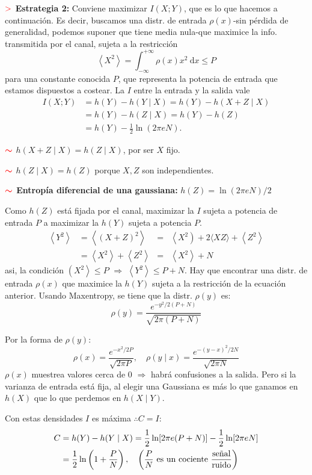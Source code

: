 \documentclass[%
 reprint,
 amsmath,amssymb,
 aps,
]{revtex4-1}
\begin{document}
\textbf{$\textcolor{red}{\mathbf{>}}$ Estrategia 2:}
Conviene maximizar $I(X ; Y)$, que es lo que hacemos a continuación. Es decir, buscamos una distr. de entrada $\rho(x)$-sin pérdida de generalidad, podemos suponer que tiene media nula-que
maximice la info. transmitida por el canal, sujeta a la restricción
$$
\left\langle X^{2}\right\rangle=\int_{-\infty}^{+\infty} \rho(x) x^{2} \mathrm{~d} x \leq P
$$
para una constante conocida $P$, que representa la potencia de entrada que estamos dispuestos a costear.
La $I$ entre la entrada y la salida vale
$$
\begin{aligned}
I(X ; Y) &=h(Y)-h(Y \mid X) =h(Y)-h(X+Z \mid X) \\
&=h(Y)-h(Z \mid X) =h(Y)-h(Z) \\
&=h(Y)-\frac{1}{2} \ln (2 \pi e N) .
\end{aligned}
$$

\textbf{$\textcolor{red}{\color{red}{\boldsymbol{\sim}}}$}
$h(X+Z \mid X)=h(Z \mid X)$, por ser $X$ fijo.

\textbf{$\textcolor{red}{\color{red}{\boldsymbol{\sim}}}$}
$h(Z \mid X)=h(Z)$ porque $X,Z$ son independientes.

\textbf{$\textcolor{red}{\color{red}{\boldsymbol{\sim}}}$ Entropía diferencial de una gaussiana:} 
$h(Z)=\ln (2 \pi e N) / 2$

Como $h(Z)$ está fijada por el canal, maximizar la $I$ sujeta a potencia de entrada $P$ a maximizar la $h(Y)$ sujeta a potencia $P$. $$
\begin{aligned}
\left\langle Y^{2}\right\rangle &=\left\langle(X+Z)^{2}\right\rangle &=&\left\langle X^{2}\right)+2\langle X Z\rangle+\left\langle Z^{2}\right\rangle \\
&=\left\langle X^{2}\right\rangle+\left\langle Z^{2}\right\rangle&=&\left\langle X^{2}\right\rangle+N
\end{aligned}
$$
asi, la condición $\left(X^{2}\right\rangle \leq P$ $\Rightarrow$
$
\left\langle Y^{2}\right\rangle \leq P+N
$. Hay que encontrar una distr. de entrada $\rho(x)$ que maximice la $h(Y)$ sujeta a la restricción de la ecuación anterior. Usando Maxentropy, se tiene que la distr. $\rho(y)$ es:
$$\rho(y)=\frac{e^{-y^{2} / 2(P+N)}}{\sqrt{2 \pi(P+N)}}$$

Por la forma de $\rho(y)$:
$$
  \rho(x) =\frac{e^{-x^{2} / 2 P}}{\sqrt{2 \pi P}} ,\quad \rho(y \mid x) =\frac{e^{-(y-x)^{2} / 2 N}}{\sqrt{2 \pi N}}
$$
$\rho(x)$ muestrea valores cerca de 0 $\Rightarrow$ habrá confusiones a la salida. Pero si la varianza de entrada está fija, al elegir una Gaussiana es más lo que ganamos en $h(X)$ que lo que perdemos en $h(X \mid Y)$.

Con estas densidades $I$ es máxima $\therefore C = I$:
$$
\begin{aligned}
C &=h(Y)-h(Y \mid X) =\frac{1}{2} \ln [2 \pi e(P+N)]-\frac{1}{2} \ln [2 \pi e N] \\
&=\frac{1}{2} \ln \left(1+\frac{P}{N}\right), \quad 
\left({P \over N} 
  \text{ es un cociente } {\text{señal} \over \text{ruido}}\right)
\end{aligned}
$$
\end{document}

